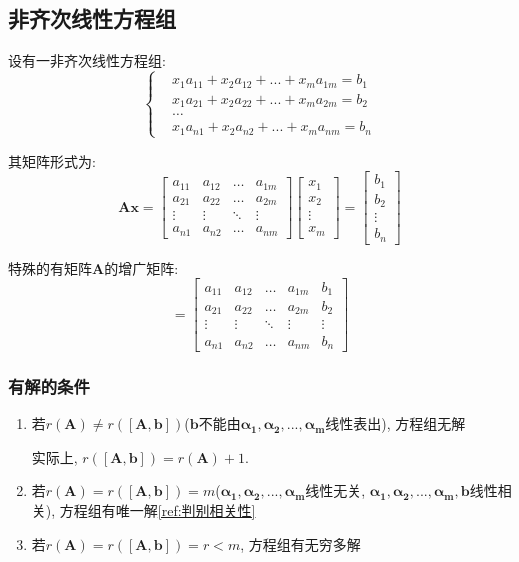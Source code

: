 \subsection{非齐次线性方程组}
设有一非齐次线性方程组:
\begin{equation*}
\left\{
\begin{aligned}
& x_{1}a_{11}+x_{2}a_{12}+...+x_{m}a_{1m}=b_{1} \\
& x_{1}a_{21}+x_{2}a_{22}+...+x_{m}a_{2m}=b_{2} \\
& \dots \\
& x_{1}a_{n1}+x_{2}a_{n2}+...+x_{m}a_{nm}=b_{n}
\end{aligned}
\right.
\end{equation*}\par
其矩阵形式为:
\begin{equation*}
\bm{A}\bm{x}=
\begin{bmatrix}
a_{11} & a_{12} & \dots & a_{1m} \\
a_{21} & a_{22} & \dots & a_{2m} \\
\vdots & \vdots & \ddots & \vdots \\
a_{n1} & a_{n2} & \dots & a_{nm}
\end{bmatrix}
\begin{bmatrix}
x_{1} \\
x_{2} \\
\vdots \\
x_{m}
\end{bmatrix}=
\begin{bmatrix}
b_{1} \\
b_{2} \\
\vdots \\
b_{n}
\end{bmatrix}
\end{equation*}\par
特殊的有矩阵$ \bm{A} $的增广矩阵:
\begin{equation*}
[\bm{A},\bm{b}]=
\begin{bmatrix}
a_{11} & a_{12} & \dots & a_{1m} & b_{1} \\
a_{21} & a_{22} & \dots & a_{2m} & b_{2} \\
\vdots & \vdots & \ddots & \vdots & \vdots \\
a_{n1} & a_{n2} & \dots & a_{nm} & b_{n}
\end{bmatrix}
\end{equation*}
\subsubsection{有解的条件}
\begin{enumerate}
\item 若$ r(\bm{A})\neq r([\bm{A},\bm{b}]) $($ \bm{b} $不能由$ \bm{\alpha_{1}},\bm{\alpha_{2}},...,\bm{\alpha_{m}} $线性表出), 方程组无解 \par
实际上, $ r([\bm{A},\bm{b}]) = r(\bm{A}) + 1 $.
\item 若$ r(\bm{A})=r([\bm{A},\bm{b}])=m $($ \bm{\alpha_{1}},\bm{\alpha_{2}},...,\bm{\alpha_{m}} $线性无关, $ \bm{\alpha_{1}},\bm{\alpha_{2}},...,\bm{\alpha_{m}},\bm{b} $线性相关), 方程组有唯一解\ref{ref:判别相关性}
\item 若$ r(\bm{A})=r([\bm{A},\bm{b}])=r<m $, 方程组有无穷多解
\end{enumerate}
